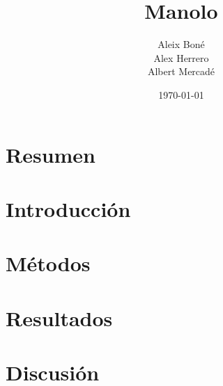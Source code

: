 

\title{
   Manolo
}
\author{
  Aleix Boné\\
  Alex Herrero\\
  Albert Mercadé
}
\date{
  \today
}


\maketitle

\section{Resumen}%
\label{sec:resumen}

\section{Introducción}%
\label{sec:introduccion}

\section{Métodos}%
\label{sec:metodos}

\section{Resultados}%
\label{sec:resultados}

\section{Discusión}%
\label{sec:discusión}



